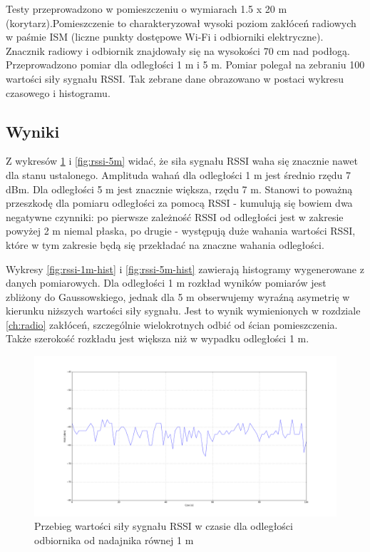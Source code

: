 Testy przeprowadzono w pomieszczeniu o wymiarach 1.5 x 20 m (korytarz).Pomieszczenie to charakteryzował wysoki poziom zakłóceń radiowych w paśmie ISM (liczne punkty dostępowe Wi-Fi i odbiorniki elektryczne). Znacznik radiowy i odbiornik znajdowały się na wysokości 70 cm nad podłogą. Przeprowadzono pomiar dla odległości 1 m i 5 m. Pomiar polegał na zebraniu 100 wartości siły sygnału RSSI. Tak zebrane dane obrazowano w postaci wykresu czasowego i histogramu. 

\subsection{Wyniki}

Z wykresów \ref{fig:rssi-1m} i \ref{fig:rssi-5m} widać, że siła sygnału RSSI waha się znacznie nawet dla stanu ustalonego. Amplituda wahań dla odległości 1 m jest średnio rzędu 7 dBm. Dla odległości 5 m jest znacznie większa, rzędu 7 m. Stanowi to poważną przeszkodę dla pomiaru odległości za pomocą RSSI - kumulują się bowiem dwa negatywne czynniki: po pierwsze zależność RSSI od odległości jest w zakresie powyżej 2 m niemal płaska, po drugie - występują duże wahania wartości RSSI, które w tym zakresie będą się przekładać na znaczne wahania odległości. 

Wykresy \ref{fig:rssi-1m-hist} i \ref{fig:rssi-5m-hist} zawierają histogramy wygenerowane z danych pomiarowych. Dla odległości 1 m rozkład wyników pomiarów jest zbliżony do Gaussowskiego, jednak dla 5 m obserwujemy wyraźną asymetrię w kierunku niższych wartości siły sygnału. Jest to wynik wymienionych w rozdziale \ref{ch:radio} zakłóceń, szczególnie wielokrotnych odbić od ścian pomieszczenia. Także szerokość rozkładu jest większa niż w wypadku odległości 1 m. 

\begin{figure}[H]
\centering
\includegraphics[width=1\textwidth]{img/1m.png}
\caption{Przebieg wartości siły sygnału RSSI w czasie dla odległości odbiornika od nadajnika równej 1 m}
\label{fig:rssi-1m}
\end{figure}


